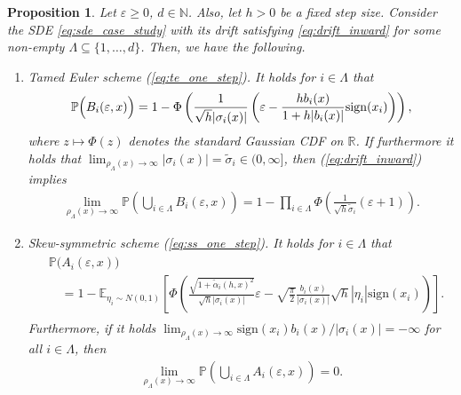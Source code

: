 \documentclass[11pt]{article}
\newtheorem{proposition}{Proposition}
\begin{document}
\begin{proposition} \label{prop:large_state}
Let $\varepsilon \ge 0$, $d \in \mathbb{N}$. Also, let $h > 0$ be a fixed step size. Consider the SDE \eqref{eq:sde_case_study} with its drift satisfying \eqref{eq:drift_inward} for some non-empty  $\Lambda \subseteq \{1, \ldots, d\}$. Then, we have the following.
\begin{enumerate}[leftmargin=0.5cm]
\item[(i)] Tamed Euler scheme (\ref{eq:te_one_step}). It holds for $i \in \Lambda$ that
% 
\begin{align}
\mathbb{P} \Bigl( B_i (\varepsilon, x)  \Bigr)  = 1 - \Phi \left( \frac{1}{\sqrt{h} |\sigma_i (x)|} \left( \varepsilon - \frac{h b_i(x)}{1 + h | b_i (x)|} \mathrm{sign} (x_i) \right) \right),
\end{align}
% 
where $z \mapsto \Phi (z)$ denotes the standard Gaussian CDF on $\mathbb{R}$. 
If furthermore it holds that $\lim_{\rho_{\Lambda}(x) \to \infty} |\sigma_i (x)| = \widetilde{\sigma}_i \in (0, \infty]$, then (\ref{eq:drift_inward}) implies
\begin{align} \label{eq:te_limit}
\lim_{\rho_\Lambda (x) \to \infty} \mathbb{P} \left( \bigcup_{i \in \Lambda} B_i (\varepsilon, x) \right) = 1 - \prod_{i \in \Lambda} \Phi \left( \tfrac{1}{\sqrt{h} \widetilde{\sigma}_i} ( \varepsilon + 1) \right). 
\end{align}
\item[(ii)] Skew-symmetric scheme  (\ref{eq:ss_one_step}). It holds for $i \in \Lambda$ that
\begin{align}
\begin{aligned} 
& \mathbb{P} \bigl( A_i (\varepsilon, x) \bigr) \nonumber \\
& \quad = 1 - \mathbb{E}_{\eta_i \sim N(0,1)} 
\left[ \Phi \left(\frac{\sqrt{1 + \tilde{\alpha}_i (h, x)^2}}{\sqrt{h} |\sigma_i (x)|} \varepsilon - \sqrt{\frac{\pi}{2}} \frac{b_i (x)}{|\sigma_i (x)|} \sqrt{h} | \eta_i | \mathrm{sign} (x_i) \right) \right].  
\end{aligned} 
\end{align}
Furthermore, if it holds $\lim_{\rho_\Lambda (x) \to \infty} \mathrm{sign} (x_i) b_i (x) / | \sigma_i (x) | = - \infty$ for all $i \in \Lambda$, then 
\begin{align} \label{eq:ss_limit}
\lim_{\rho_{\Lambda} (x) \to \infty} \mathbb{P} \left( \bigcup_{i \in \Lambda} A_i (\varepsilon, x) \right) = 0.  
\end{align}
\end{enumerate}
\end{proposition}
\end{document}
